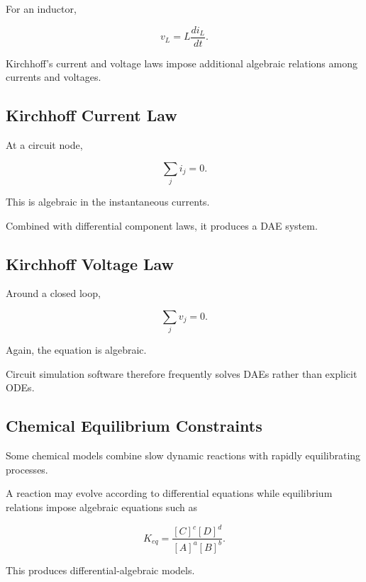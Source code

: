 For an inductor,

\[
\boxed{
v_L
=
L
\frac{di_L}{dt}.
}
\]

Kirchhoff's current and voltage laws impose additional algebraic
relations among currents and voltages.

\subsection{Kirchhoff Current Law}
\label{subsec:kirchhoff-current-law-dae}

At a circuit node,

\[
\boxed{
\sum_j i_j=0.
}
\]

This is algebraic in the instantaneous currents.

Combined with differential component laws, it produces a DAE system.

\subsection{Kirchhoff Voltage Law}
\label{subsec:kirchhoff-voltage-law-dae}

Around a closed loop,

\[
\boxed{
\sum_j v_j=0.
}
\]

Again, the equation is algebraic.

Circuit simulation software therefore frequently solves DAEs rather than
explicit ODEs.

\subsection{Chemical Equilibrium Constraints}
\label{subsec:chemical-equilibrium-dae}

Some chemical models combine slow dynamic reactions with rapidly
equilibrating processes.

A reaction may evolve according to differential equations while
equilibrium relations impose algebraic equations such as

\[
\boxed{
K_{eq}
=
\frac{
[C]^c[D]^d
}{
[A]^a[B]^b
}.
}
\]

This produces differential-algebraic models.

